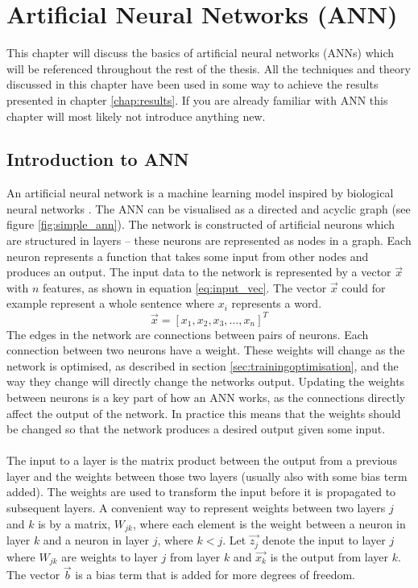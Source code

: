 \chapter{Artificial Neural Networks (ANN)}\label{chap:ann}
This chapter will discuss the basics of artificial neural networks (ANNs) which will be referenced throughout the rest of the thesis. All the techniques and theory discussed in this chapter have been used in some way to achieve the results presented in chapter \ref{chap:results}. If you are already familiar with ANN this chapter will most likely not introduce anything new.

\section{Introduction to ANN}
An artificial neural network is a machine learning model inspired by biological neural networks \parencite{lippmann1987introduction}. The ANN can be visualised as a directed and acyclic graph \parencite{Goodfellow-et-al-2016} (see figure \ref{fig:simple_ann}). The network is constructed of artificial neurons which are structured in layers -- these neurons are represented as nodes in a graph. Each neuron represents a function that takes some input from other nodes and produces an output. The input data to the network is represented by a vector $\vec{x}$ with $n$ features, as shown in equation \ref{eq:input_vec}. The vector $\vec{x}$ could for example represent a whole sentence where $x_i$ represents a word.
\begin{equation}\label{eq:input_vec}
    \vec{x} = [x_1, x_2, x_3, \dots , x_n]^T
\end{equation}
The edges in the network are connections between pairs of neurons. Each connection between two neurons have a weight. These weights will change as the network is optimised, as described in section \ref{sec:trainingoptimisation}, and the way they change will directly change the networks output. Updating the weights between neurons is a key part of how an ANN works, as the connections directly affect the output of the network. In practice this means that the weights should be changed so that the network produces a desired output given some input. 
\\\\
The input to a layer is the matrix product between the output from a previous layer and the weights between those two layers (usually also with some bias term added). The weights are used to transform the input before it is propagated to subsequent layers. A convenient way to represent weights between two layers $j$ and $k$ is by a matrix, $W_{jk}$, where each element is the weight between a neuron in layer $k$ and a neuron in layer $j$, where $k<j$. Let $\vec{z_j}$ denote the input to layer $j$ where $W_{jk}$ are weights to layer $j$ from layer $k$ and $\vec{x_k}$ is the output from layer $k$. The vector $\vec{b}$ is a bias term that is added for more degrees of freedom. 
